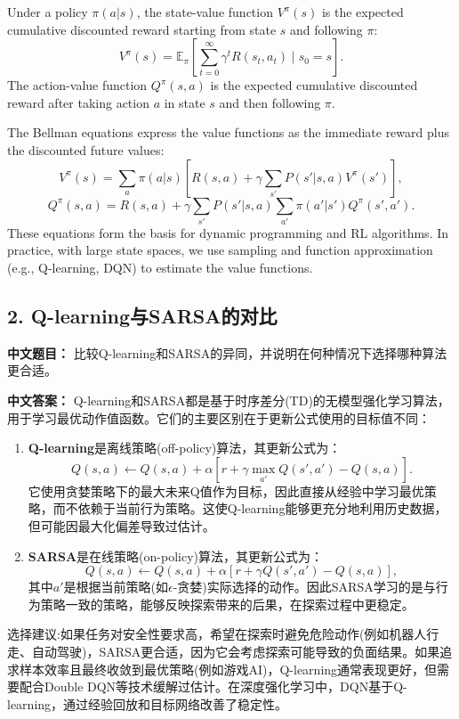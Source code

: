 \documentclass[10pt,a4paper]{ctexart}
\begin{document}
Under a policy \(\pi(a|s)\), the state-value function \(V^\pi(s)\) is the expected cumulative discounted reward starting from state \(s\) and following \(\pi\):
\[
V^\pi(s) = \mathbb{E}_\pi \left[ \sum_{t=0}^{\infty} \gamma^t R(s_t, a_t) \mid s_0 = s \right].
\]  
The action-value function \(Q^\pi(s,a)\) is the expected cumulative discounted reward after taking action \(a\) in state \(s\) and then following \(\pi\).

The Bellman equations express the value functions as the immediate reward plus the discounted future values:
\[
V^\pi(s) = \sum_{a} \pi(a|s) \left[ R(s,a) + \gamma \sum_{s'} P(s'|s,a) V^\pi(s') \right],
\]  
\[
Q^\pi(s,a) = R(s,a) + \gamma \sum_{s'} P(s'|s,a) \sum_{a'} \pi(a'|s') Q^\pi(s',a').
\]  
These equations form the basis for dynamic programming and RL algorithms. In practice, with large state spaces, we use sampling and function approximation (e.g., Q-learning, DQN) to estimate the value functions.

\subsection*{2. Q-learning与SARSA的对比}
\textbf{中文题目：} 比较Q-learning和SARSA的异同，并说明在何种情况下选择哪种算法更合适。

\textbf{中文答案：}  
Q-learning和SARSA都是基于时序差分(TD)的无模型强化学习算法，用于学习最优动作值函数。它们的主要区别在于更新公式使用的目标值不同：

\begin{enumerate}
    \item \textbf{Q-learning}是离线策略(off-policy)算法，其更新公式为：
  \[
  Q(s,a) \leftarrow Q(s,a) + \alpha \left[ r + \gamma \max_{a'} Q(s',a') - Q(s,a) \right].
  \]
  它使用贪婪策略下的最大未来Q值作为目标，因此直接从经验中学习最优策略，而不依赖于当前行为策略。这使Q-learning能够更充分地利用历史数据，但可能因最大化偏差导致过估计。

    \item \textbf{SARSA}是在线策略(on-policy)算法，其更新公式为：
  \[
  Q(s,a) \leftarrow Q(s,a) + \alpha \left[ r + \gamma Q(s',a') - Q(s,a) \right],
  \]
  其中\(a'\)是根据当前策略(如\(\epsilon\)-贪婪)实际选择的动作。因此SARSA学习的是与行为策略一致的策略，能够反映探索带来的后果，在探索过程中更稳定。
\end{enumerate}

 选择建议:如果任务对安全性要求高，希望在探索时避免危险动作(例如机器人行走、自动驾驶)，SARSA更合适，因为它会考虑探索可能导致的负面结果。如果追求样本效率且最终收敛到最优策略(例如游戏AI)，Q-learning通常表现更好，但需要配合Double DQN等技术缓解过估计。在深度强化学习中，DQN基于Q-learning，通过经验回放和目标网络改善了稳定性。
\end{document}
